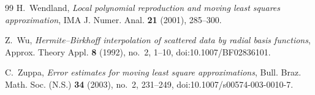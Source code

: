 \documentclass[12pt]{amsart}
\theoremstyle{definition}
\theoremstyle{remark}
\begin{document}
\begin{thebibliography}{99}
H.~Wendland, \emph{Local polynomial reproduction and moving least squares approximation}, IMA J.
Numer. Anal. \textbf{21} (2001), 285--300.

Z.~Wu, \emph{Hermite--{B}irkhoff interpolation of scattered data by radial basis functions}, Approx. Theory Appl. \textbf{8} (1992), no.~2, 1--10, doi:10.1007/BF02836101.

C.~Zuppa, \emph{Error estimates for moving least square approximations}, Bull. Braz. Math.
Soc. (N.S.) \textbf{34} (2003), no.~2, 231--249, doi:10.1007/s00574-003-0010-7.

\end{thebibliography}
\end{document}
